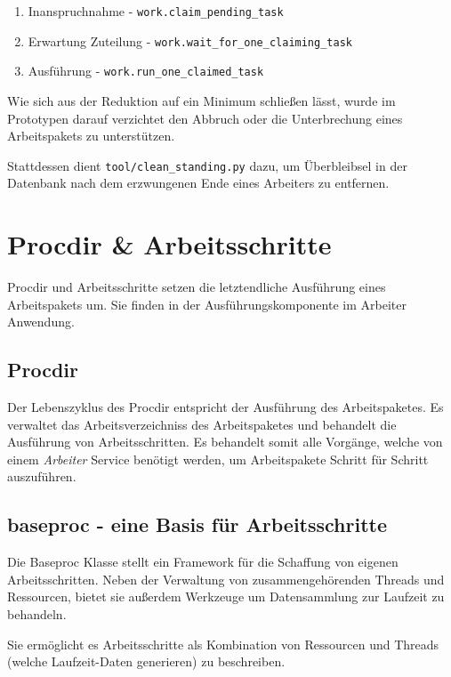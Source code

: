 \begin{enumerate}
    \item Inanspruchnahme - \verb|work.claim_pending_task|
    \item Erwartung Zuteilung - \verb|work.wait_for_one_claiming_task|
    \item Ausführung - \verb|work.run_one_claimed_task|
\end{enumerate}

Wie sich aus der Reduktion auf ein Minimum schließen lässt,
wurde im Prototypen darauf verzichtet den Abbruch oder die Unterbrechung
eines Arbeitspakets zu unterstützen.

Stattdessen dient \verb|tool/clean_standing.py| dazu,
um Überbleibsel in der Datenbank nach dem erzwungenen Ende
eines Arbeiters zu entfernen.



\section{Procdir \& Arbeitsschritte}

Procdir und Arbeitsschritte setzen die letztendliche Ausführung eines Arbeitspakets um.
Sie finden in der Ausführungskomponente im Arbeiter Anwendung.


\subsection{Procdir}

Der Lebenszyklus des Procdir entspricht der Ausführung des Arbeitspaketes.
Es verwaltet das Arbeitsverzeichniss des Arbeitspaketes und behandelt die Ausführung von Arbeitsschritten.
Es behandelt somit alle Vorgänge, welche von einem \emph{Arbeiter} Service benötigt werden, um  Arbeitspakete Schritt für Schritt auszuführen.

\subsection{baseproc - eine Basis für Arbeitsschritte}

Die Baseproc Klasse stellt ein Framework für die Schaffung von eigenen Arbeitsschritten.
Neben der Verwaltung von zusammengehörenden Threads und Ressourcen, bietet sie außerdem Werkzeuge um Datensammlung zur Laufzeit zu behandeln.

Sie ermöglicht es Arbeitsschritte als Kombination von Ressourcen und Threads (welche Laufzeit-Daten generieren) zu beschreiben.


